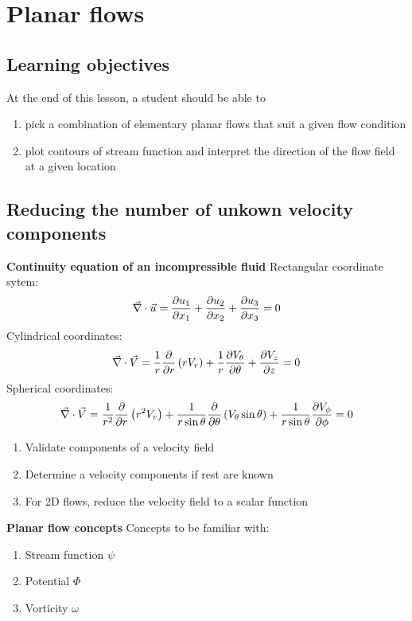 \chapter{Planar flows}
\label{ch:planflow}

\section{Learning objectives}

At the end of this lesson, a student should be able to
\begin{enumerate}
\item pick a combination of elementary planar flows that suit a given flow condition
\item plot contours of stream function and interpret the direction of the flow field at a given location
\end{enumerate}

\section{Reducing the number of unkown velocity components}

{\bf Continuity equation of an incompressible fluid}
Rectangular coordinate sytem:
$$ \vec{\nabla} \cdot \vec{u} = {\partial u_1 \over \partial x_1} + {\partial u_2 \over \partial x_2} + {\partial u_3 \over \partial x_3} = 0  $$
Cylindrical coordinates:
$$ \vec{\nabla} \cdot \vec{V} = {1 \over r} {\partial \over \partial r} \left( r V_r \right) + {1 \over r} {\partial V_\theta \over \partial \theta} + {\partial V_z \over \partial z} = 0 $$
Spherical coordinates:
$$ \vec{\nabla} \cdot \vec{V} = {1 \over r^2} {\partial \over \partial r} \left( r^2 V_r \right) + {1 \over r \sin\theta} {\partial \over \partial \theta} \left( V_\theta \sin\theta \right) + {1 \over r \sin\theta} {\partial V_\phi \over \partial \phi} = 0 $$
\begin{enumerate}
\item Validate components of a velocity field
\item Determine a velocity components if rest are known
\item For 2D flows, reduce the velocity field to a scalar function
\end{enumerate}


{\bf Planar flow concepts}
Concepts to be familiar with:
\begin{enumerate}
\item Stream function $\psi$
\item Potential $\Phi$
\item Vorticity $\omega$
\end{enumerate}

